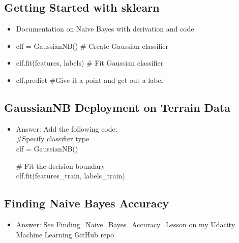 \documentclass[12pt]{report}
\begin{document}
\subsection{Getting Started with sklearn}

\begin{itemize}

\item Documentation on Naive Bayes with derivation and code 

\item clf = GaussianNB() \# Create Gaussian classifier

\item clf.fit(features, labels) \# Fit Gaussian classifier

\item clf.predict \#Give it a point and get out a label

\end{itemize}

\subsection{GaussianNB Deployment on Terrain Data}

\begin{itemize}

\item Answer: Add the following code: \\

\#Specify classifier type \\
clf = GaussianNB() \\

\bigskip

\# Fit the decision boundary \\
clf.fit(features\_train, labels\_train) \\

\end{itemize}

\subsection{Finding Naive Bayes Accuracy}

\begin{itemize}

\item Answer: See Finding\_Naive\_Bayes\_Accuracy\_Lesson on my Udacity Machine Learning GitHub repo

\end{itemize}
\end{document}
